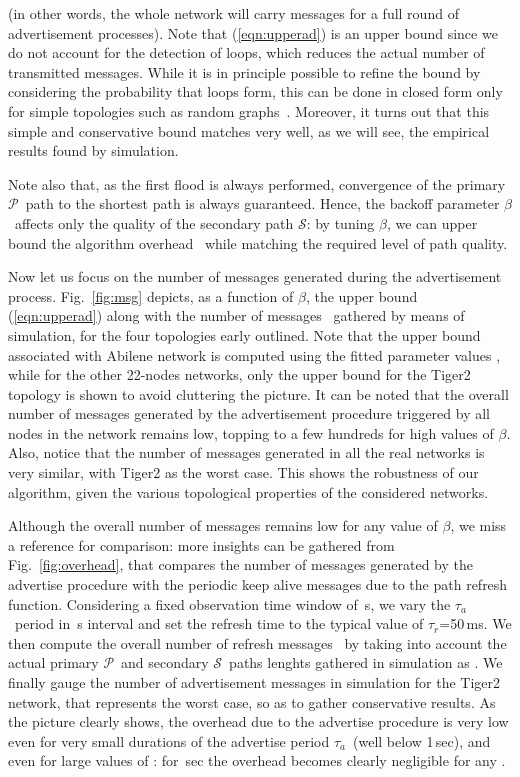 \documentclass[conference]{IEEEtran}
\newcommand{\PA}{\ensuremath{\mathcal{P}}}
\newcommand{\SE}{\ensuremath{\mathcal{S}}}
\newcommand{\Be}{\ensuremath{\beta}} \newcommand{\ML}{\ensuremath{\kappa}} \newcommand{\PB}{\ensuremath{p_b}}
\newcommand{\tadvertise}{\ensuremath{\tau_{a}}} \newcommand{\trefresh}{\ensuremath{\tau_{r}}} \newcommand{\tm}{\tadvertise} \newcommand{\tr}{\trefresh}
\begin{document}
(in other words, the whole network will carry  messages for a full round of  advertisement processes). Note  that  (\ref{eqn:upperad}) is an upper bound since we do not account for  the detection of loops, which  reduces  the actual number of transmitted messages. While it is in principle  possible to refine the bound by considering the probability that loops form, this can  be done in closed form only for simple topologies such as random graphs~\cite{janson94graphs}.
Moreover, it turns out that this simple and conservative bound  matches very well, as we will see, the empirical results found by simulation.  

Note also that, as the first flood is always performed, convergence of the primary \PA\ path to the shortest path is always guaranteed. Hence, the backoff parameter \Be\ affects only the quality of the  secondary path \SE: by tuning \Be,  we can upper bound the algorithm overhead \nm\  while  matching the required level of path quality.

Now let us focus on the number of messages generated during the advertisement process.
Fig.~\ref{fig:msg} depicts, as a function of \Be, the upper bound (\ref{eqn:upperad})  along with the number of messages  \nm\ gathered by means of simulation, for the four topologies early outlined.   Note that the upper bound
associated with  Abilene network is computed using the fitted parameter values , while for the other 22-nodes networks, only the upper bound for the Tiger2 topology is shown  to avoid cluttering the picture. It can be noted that the overall number of messages generated by the advertisement procedure triggered by all nodes in the network remains low, topping to a few hundreds for high values of \Be. Also, notice that the number of messages generated in all the real networks is very similar, with Tiger2 as the worst case. This shows the robustness of our algorithm, given the various  topological properties of the considered networks.

Although the overall number of messages remains low for any value of \Be, we miss a reference for comparison: more insights can be gathered  from Fig.~\ref{fig:overhead}, that compares the number of messages generated by the advertise procedure with the periodic keep alive messages due to the path refresh function. Considering a fixed observation time window of \,s, we vary the \tadvertise\ period in \,s interval and set the refresh time to the typical value of \trefresh=50\,ms. We then compute the overall number of refresh messages \nrefresh\ by taking into account the actual primary  \PA\ and secondary \SE\ paths lenghts gathered in simulation  as . We finally gauge the number of advertisement messages in simulation for the Tiger2 network, that represents the worst case, so as to gather conservative results.
 As the picture clearly shows, the overhead due to the advertise procedure is very low even for very small durations of the advertise period \tm\ (well below 1\,sec), and even for large values of : for \,sec the overhead becomes clearly negligible for any .
\end{document}
